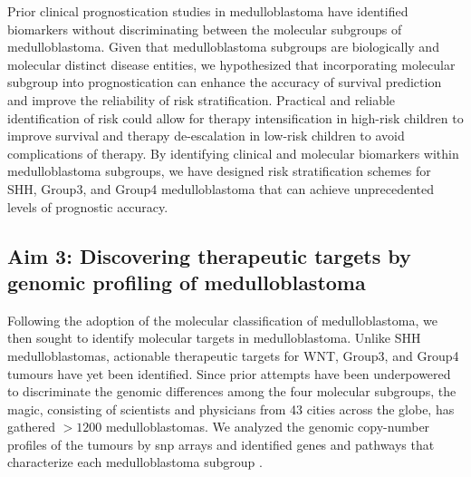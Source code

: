 Prior clinical prognostication studies in medulloblastoma have identified biomarkers without discriminating between the molecular subgroups of medulloblastoma. Given that medulloblastoma subgroups are biologically and molecular distinct disease entities, we hypothesized that incorporating molecular subgroup into prognostication can enhance the accuracy of survival prediction and improve the reliability of risk stratification. Practical and reliable identification of risk could allow for therapy intensification in high-risk children to improve survival and therapy de-escalation in low-risk children to avoid complications of therapy. By identifying clinical and molecular biomarkers within medulloblastoma subgroups, we have designed risk stratification schemes for SHH, Group3, and Group4 medulloblastoma that can achieve unprecedented levels of prognostic accuracy.

\subsection*{Aim 3: Discovering therapeutic targets by genomic profiling of medulloblastoma}

Following the adoption of the molecular classification of medulloblastoma, we then sought to identify molecular targets in medulloblastoma. Unlike SHH medulloblastomas, actionable therapeutic targets for WNT, Group3, and Group4 tumours have yet been identified. Since prior attempts have been underpowered to discriminate the genomic differences among the four molecular subgroups, the \gls{magic}, consisting of scientists and physicians from 43 cities across the globe, has gathered $>1200$ medulloblastomas. We analyzed the genomic copy-number profiles of the tumours by \gls{snp} arrays and identified genes and pathways that characterize each medulloblastoma subgroup .

